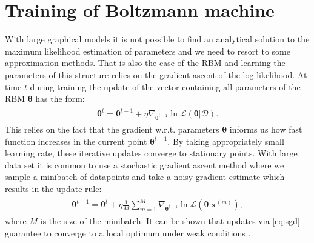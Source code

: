 \section{Training of Boltzmann machine}
With large graphical models it is not possible to find an analytical solution to the maximum likelihood estimation of parameters and we need to resort to some approximation methods. That is also the case of the RBM and learning the parameters of this structure relies on the gradient ascent of the log-likelihood. At time $t$ during training the update of the vector containing all parameters of the RBM $\mathbf{\theta}$ has the form:
\begin{align}
\begin{split}
\mathbf{\theta}^{t} = \mathbf{\theta}^{t-1} + \eta \nabla_{\mathbf{\theta}^{t-1}}  \ln \mathcal{L}(\mathbf{\theta}| \mathcal{D}). 
\end{split}
\end{align}
This relies on the fact that the gradient w.r.t. parameters $\mathbf{\theta}$ informs us how fast function increases in the current point $\mathbf{\theta}^{t-1}$. 
By taking appropriately small learning rate, these iterative updates converge to stationary points. With large data set it is common to use a stochastic gradient ascent method \cite{robbins1951stochastic} where we sample a minibatch of datapoints and take a noisy gradient estimate which results in the update rule:
\begin{align}
\begin{split}
\mathbf{\theta}^{t+1} = \mathbf{\theta}^{t} + \eta \frac{1}{M}  \sum_{m =1}^{M} \nabla_{\mathbf{\theta}^{t-1}} \ln \mathcal{L}(\mathbf{\theta}| \mathbf{x}^{(m)}),
\end{split}
\label{eq:sgd}
\end{align}
where $M$ is the size of the minibatch. It can be shown that updates via \ref{eq:sgd} guarantee to converge to a local optimum under weak conditions \cite{bottou1998online}.

